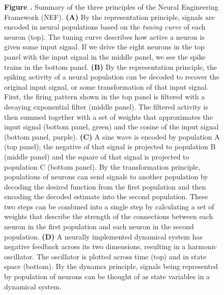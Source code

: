 \documentclass{frontiersSCNS}
\begin{document}
\begin{figure}
 \textbf{\label{fig:nef} Figure .}{
   Summary of the three principles of the Neural Engineering Framework
   (NEF). \textbf{(A)} By the representation principle, signals are encoded
   in neural populations based on the \textit{tuning curve}
   of each neuron (top). The tuning curve describes
   how active a neuron is given some input signal.
   If we drive the eight neurons in the top panel
   with the input signal in the middle panel,
   we see the spike trains in the bottom panel.
   \textbf{(B)} By the representation principle,
   the spiking activity of a neural population
   can be decoded to recover the original input signal,
   or some transformation of that input signal.
   First, the firing pattern shown in the top panel
   is filtered with a decaying exponential filter (middle panel).
   The filtered activity is then summed together
   with a set of weights that approximates
   the input signal (bottom panel, green)
   and the cosine of the input signal (bottom panel, purple).
   \textbf{(C)} A sine wave is encoded by population A (top panel);
   the negative of that signal is projected
   to population B (middle panel)
   and the square of that signal is projected
   to population C (bottom panel).
   By the transformation principle,
   populations of neurons can send signals
   to another population by decoding
   the desired function from the first population
   and then encoding the decoded estimate
   into the second population.
   These two steps can be combined into a single step
   by calculating a set of weights
   that describe the strength of the connections
   between each neuron in the first population
   and each neuron in the second population.
   \textbf{(D)} A neurally implemented dynamical system
   has negative feedback across its two dimensions,
   resulting in a harmonic oscillator.
   The oscillator is plotted across time (top)
   and in state space (bottom).
   By the dynamcs principle,
   signals being represented by population of neurons
   can be thought of as state variables in a dynamical system.
   }
\end{figure}
\end{document}
